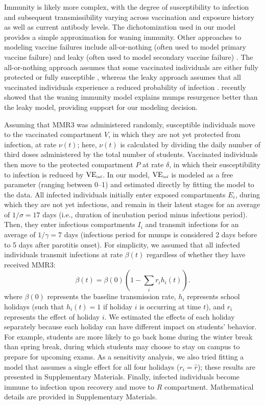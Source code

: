 \documentclass[12pt]{article}
\begin{document}
Immunity is likely more complex, with the degree of susceptibility to infection and subsequent transmissibility varying across vaccination and exposure history as well as current antibody levels.
The dichotomization used in our model provides a simple approximation for waning immunity.
Other approaches to modeling vaccine failures include all-or-nothing (often used to model primary vaccine failure) and leaky (often used to model secondary vaccine failure) \citep{smith1984assessment}. 
The all-or-nothing approach assumes that some vaccinated individuals are either fully protected or fully susceptible \citep{kanaan2002estimation}, whereas the leaky approach assumes that  all vaccinated individuals experience a reduced probability of infection \citep{gokhale2023disentangling}.
\cite{gokhale2023disentangling} recently showed that the waning immunity model explains mumps resurgence better than the leaky model, providing support for our modeling decision.

Assuming that MMR3 was administered randomly, susceptible individuals move to the vaccinated compartment $V$, in which they are not yet protected from infection, at rate $\nu(t)$; 
here, $\nu(t)$ is calculated by dividing the daily number of third doses administered by the total number of students.
Vaccinated individuals then move to the protected compartment $P$ at rate $\delta$, in which their susceptibility to infection is reduced by $\mathrm{VE}_{\textrm{\tiny{inf}}}$.
In our model, $\mathrm{VE}_{\textrm{\tiny{inf}}}$ is modeled as a free parameter (ranging between 0--1) and estimated directly by fitting the model to the data.
All infected individuals initially enter exposed compartments $E_i$, during which they are not yet infectious, and remain in their latent stages for an average of $1/\sigma=17$ days (i.e., duration of incubation period minus infectious period).
Then, they enter infectious compartments $I_i$ and transmit infections for an average of $1/\gamma=7$ days (infectious period for mumps is considered 2 days before to 5 days after parotitis onset).
For simplicity, we assumed that all infected individuals transmit infections at rate $\beta(t)$ regardless of whether they have received MMR3:
\begin{equation}
\beta(t) = \beta(0) \left(1 - \sum_i r_i h_i(t)\right).
\label{eq:beta}
\end{equation}
where $\beta(0)$ represents the baseline transmission rate, $h_i$ represents school holidays (such that $h_i(t) = 1$ if holiday $i$ is occurring at time $t$), and $r_i$ represents the effect of holiday $i$.
We estimated the effects of each holiday separately because each holiday can have different impact on students' behavior.
For example, students are more likely to go back home during the winter break than spring break, during which students may choose to stay on campus to prepare for upcoming exams.
As a sensitivity analysis, we also tried fitting a model that assumes a single effect for all four holidays ($r_i = \hat{r}$); these results are presented in Supplementary Materials.
Finally, infected individuals become immune to infection upon recovery and move to $R$ compartment.
Mathematical details are provided in Supplementary Materials.
\end{document}
